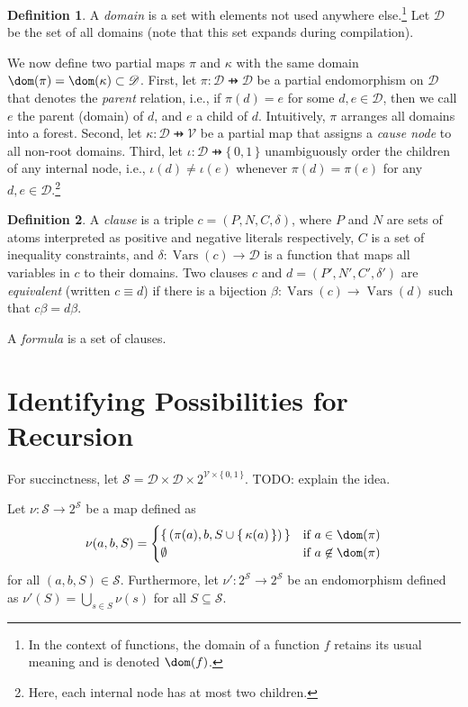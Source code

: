 \documentclass{article}
\theoremstyle{definition}
\newtheorem{definition}{Definition}
\DeclareMathOperator{\Vars}{Vars}
\begin{document}
\begin{definition}
  A \emph{domain} is a set with elements not used anywhere else.\footnote{In the context of functions, the domain of a function $f$ retains its usual meaning and is denoted $\dom(f)$.} Let $\mathscr{D}$ be the set of all domains (note that this set expands during compilation).

  We now define two partial maps $\pi$ and $\kappa$ with the same domain $\dom(\pi) = \dom(\kappa) \subset \mathscr{D}$. First, let $\pi\colon \mathscr{D} \pfun \mathscr{D}$ be a partial endomorphism on $\mathscr{D}$ that denotes the \emph{parent} relation, i.e., if $\pi(d) = e$ for some $d, e \in \mathscr{D}$, then we call $e$ the parent (domain) of $d$, and $e$ a child of $d$. Intuitively, $\pi$ arranges all domains into a forest. Second, let $\kappa\colon \mathscr{D} \pfun \mathscr{V}$ be a partial map that assigns a \emph{cause node} to all non-root domains. Third, let $\iota\colon \mathscr{D} \pfun \{\, 0, 1 \,\}$ unambiguously order the children of any internal node, i.e., $\iota(d) \ne \iota(e)$ whenever $\pi(d) = \pi(e)$ for any $d, e \in \mathscr{D}$.\footnote{Here, each internal node has at most two children.}
\end{definition}

\begin{definition}
  A \emph{clause} is a triple $c = (P, N, C, \delta)$, where $P$ and $N$ are sets of atoms interpreted as positive and negative literals respectively, $C$ is a set of inequality constraints, and $\delta\colon \Vars(c) \to \mathscr{D}$ is a function that maps all variables in $c$ to their domains. Two clauses $c$ and $d = (P', N', C', \delta')$ are \emph{equivalent} (written $c \equiv d$) if there is a bijection $\beta\colon \Vars(c) \to \Vars(d)$ such that $c\beta = d\beta$.
\end{definition}

A \emph{formula} is a set of clauses.

\section{Identifying Possibilities for Recursion}

For succinctness, let $\mathscr{S} = \mathscr{D} \times \mathscr{D} \times 2^{\mathscr{V} \times \{\, 0, 1 \,\}}$. TODO: explain the idea.

Let $\nu\colon \mathscr{S} \to 2^{\mathscr{S}}$ be a map defined as
\[
\nu(a, b, S) =
\begin{cases}
  \{\,(\pi(a), b, S \cup \{\, \kappa(a) \,\})\,\} & \text{if } a \in \dom(\pi) \\
  \emptyset & \text{if } a \not\in \dom(\pi)
\end{cases}
\]
for all $(a, b, S) \in \mathscr{S}$. Furthermore, let $\nu'\colon 2^{\mathscr{S}} \to 2^{\mathscr{S}}$ be an endomorphism defined as $\nu'(S) = \bigcup_{s \in S} \nu(s)$ for all $S \subseteq \mathscr{S}$.
\end{document}
